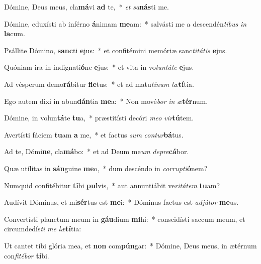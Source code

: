 \item Dómine, Deus meus, cla\textbf{má}vi \textbf{ad} te,~* \textit{et} \textit{sa}\textbf{nás}ti me.
\item Dómine, eduxísti ab inférno \textbf{á}nimam \textbf{me}am:~* salvásti me a descendén\textit{ti}\textit{bus} \textit{in} \textbf{la}cum.
\item Psállite Dómino, \textbf{sanc}ti \textbf{e}jus:~* et confitémini memóriæ sanc\textit{ti}\textit{tá}\textit{tis} \textbf{e}jus.
\item Quóniam ira in indignati\textbf{ó}ne \textbf{e}jus:~* et vita in vo\textit{lun}\textit{tá}\textit{te} \textbf{e}jus.
\item Ad vésperum demo\textbf{rá}bitur \textbf{fle}tus:~* et ad matu\textit{tí}\textit{num} \textit{læ}\textbf{tí}tia.
\item Ego autem dixi in abun\textbf{dán}tia \textbf{me}a:~* Non mové\textit{bor} \textit{in} \textit{æ}\textbf{tér}num.
\item Dómine, in volun\textbf{tá}te \textbf{tu}a,~* præstitísti decóri \textit{me}\textit{o} \textit{vir}\textbf{tú}tem.
\item Avertísti fáciem \textbf{tu}am \textbf{a} me,~* et factus \textit{sum} \textit{con}\textit{tur}\textbf{bá}tus.
\item Ad te, Dómi\textbf{ne}, cla\textbf{má}bo:~* et ad Deum me\textit{um} \textit{de}\textit{pre}\textbf{cá}bor.
\item Quæ utílitas in \textbf{sán}guine \textbf{me}o,~* dum descéndo in \textit{cor}\textit{rup}\textit{ti}\textbf{ó}nem?
\item Numquid confitébitur \textbf{ti}bi \textbf{pul}vis,~* aut annuntiábit ve\textit{ri}\textit{tá}\textit{tem} \textbf{tu}am?
\item Audívit Dóminus, et mi\textbf{sér}tus est \textbf{me}i:~* Dóminus factus est \textit{ad}\textit{jú}\textit{tor} \textbf{me}us.
\item Convertísti planctum meum in \textbf{gáu}dium \textbf{mi}hi:~* conscidísti saccum meum, et circumdedís\textit{ti} \textit{me} \textit{læ}\textbf{tí}tia:
\item Ut cantet tibi glória mea, et \textbf{non} com\textbf{pún}gar:~* Dómine, Deus meus, in ætérnum con\textit{fi}\textit{té}\textit{bor} \textbf{ti}bi.
